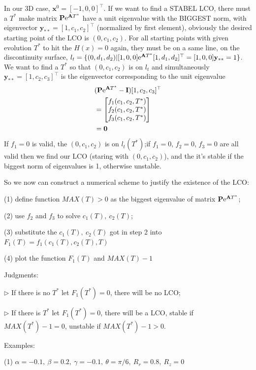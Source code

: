 \documentclass[a4paper,10pt]{article}
\begin{document}
In our 3D case, $\mathbf{x}^0 = [-1,0,0]^{\top}$. If we want to find a STABEL LCO, there must a $T^*$ make matrix $\mathbf{P}{\rm e}^{\mathbf{A} T^*} $ have a unit eigenvalue with the  BIGGEST norm, with  eigenvector $\mathbf{y_{**}}=[1,c_1,c_2]^{\top}$ (normalized by first element), obviously the desired starting point of the LCO is $(0,c_1,c_2)$. For all starting points with given evolution $T^*$ to hit the $H(x)=0$ again, they must be on a same line, on the discontinuity surface, $l_t = \{(0,d_1,d_2)|[1,0,0]{\rm e}^{\mathbf{A} T^*} [1,d_1,d_2]^{\top} =[1,0,0]\mathbf{y_{**}} =1  \}$.  We want to find a $T^*$ so that $(0,c_1,c_2)$ is on $l_t$ and simultaneously $\mathbf{y_{**}}=[1,c_2,c_3]^{\top}$ is the eigenvector corresponding to the unit eigenvalue \begin{align}
	\nonumber
	&(\mathbf{P}{\rm e}^{\mathbf{A} T^*} - \mathbf{I})[1,c_2,c_3]^{\top} \\
	\nonumber
	&= \begin{bmatrix}
	f_1(c_1,c_2,T^*)\\
	f_2(c_1,c_2,T^*)\\
	f_3(c_1,c_2,T^*)
	\end{bmatrix}\\
	&=\mathbf{0}
	\label{eq:pseudo Eigenvector equation}
\end{align}
If $f_1=0$ is valid, the  $(0,c_1,c_2)$ is on $l_t(T^*)$;if $f_1 =0$, $f_2 =0$, $f_3 =0$ are all valid then we find our LCO (staring with $(0,c_1,c_2)$), and the it's stable if the biggest norm of eigenvalues is 1, otherwise unstable. 

So we now can construct a numerical scheme to justify the existence of the LCO:

(1) define function $MAX(T) >0$ as the biggest eigenvalue of 
matrix $\mathbf{P}{\rm e}^{\mathbf{A} T^*} $;

(2) use $f_2$ and $f_3$ to solve $c_1(T),~c_2(T)$;

(3) substitute the $c_1(T),~c_2(T)$ got in step 2 into $F_1(T)=f_1(c_1(T),c_2(T),T)$

(4) plot the function $F_1(T)$ and $MAX(T)-1$

Judgments:

$\triangleright$ If there is no $T^*$ let $F_1(T^*)=0$, there will be no LCO;

$\triangleright$ If there is $T^*$ let $F_1(T^*)=0$, there will be a LCO, stable if $MAX(T^*)-1=0$, unstable if $MAX(T^*)-1>0$.

Examples:

(1) $\alpha = -0.1,~\beta =0.2,~ \gamma = -0.1,~\theta = \pi/6,~R_r=0.8,~R_z=0$
\end{document}
